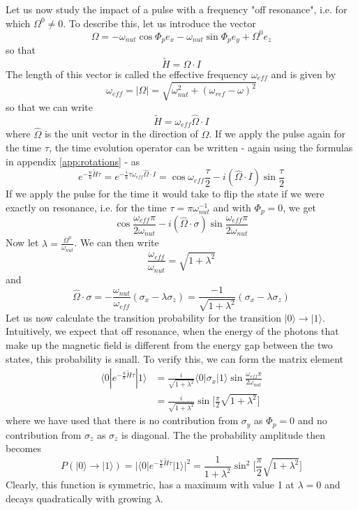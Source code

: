 \documentclass[a4paper, draft]{article}
\theoremstyle{own}
\theoremstyle{remark}
\begin{document}
Let us now study the impact of a pulse with a frequency "off resonance", i.e. for which $\Omega^0 \neq 0$. To describe this, let us introduce the vector
$$
\Omega = - \omega_{nut} \cos \Phi_p e_x  -  \omega_{nut} \sin \Phi_p e_y + \Omega^0 e_z
$$
so that 
$$
\widetilde{H} = \Omega \cdot I
$$
The length of this vector is called the effective frequency $\omega_{eff}$ and is given by
$$
\omega_{eff} = |\Omega| = \sqrt{\omega_{nut}^2 + (\omega_{ref} - \omega)^2}
$$
so that we can write
$$
\widetilde{H} = \omega_{eff} \hat{\Omega} \cdot I
$$
where $\hat{\Omega}$ is the unit vector in the direction of $\Omega$. If we apply the pulse again for the time $\tau$, the time evolution operator can be written - again using the formulas in appendix \ref{app:rotations} - as
$$
e^{-\frac{u}{\hbar} \widetilde{H} \tau} = e^{-\frac{i}{\hbar} \tau \omega_{eff} \hat{\Omega} \cdot I } = \cos \omega_{eff} \frac{\tau}{2} - i (\hat{\Omega} \cdot I) \sin \frac{\tau}{2}
$$
If we apply the pulse for the time it would take to flip the state if we were exactly on resonance, i.e. for the time $\tau = \pi  \omega_{nut}^{-1}$ and with $\Phi_p = 0$, we get
$$
\cos \frac{\omega_{eff}\pi }{2\omega_{nut}} - i (\hat{\Omega} \cdot \sigma) \sin  \frac{\omega_{eff}\pi }{2\omega_{nut}}
$$
Now let $\lambda = \frac{\Omega^0}{\omega_{nut}}$. We can then write
$$
\frac{\omega_{eff}}{\omega_{nut}} = \sqrt{1+\lambda^2}
$$
and
$$
\hat{\Omega} \cdot \sigma = - \frac{\omega_{nut}}{\omega_{eff}} (\sigma_x - \lambda \sigma_z) 
=
\frac{-1}{\sqrt{1+\lambda^2}} (\sigma_x - \lambda \sigma_z)
$$
Let us now calculate the transition probability for the transition $|0 \rangle \rightarrow |1 \rangle$. Intuitively, we expect that off resonance, when the energy of the photons that make up the magnetic field is different from the energy gap between the two states, this probability is small. To verify this, we can form the matrix element
\begin{align*}
\langle 0 | e^{-\frac{u}{\hbar} \widetilde{H} \tau} | 1 \rangle
 &=
\frac{i}{\sqrt{1+\lambda^2}}  \langle 0 | \sigma_x | 1 \rangle 
\sin  \frac{\omega_{eff}\pi }{2\omega_{nut}} \\
&= \frac{i}{\sqrt{1+\lambda^2}} \sin  \big[ \frac{\pi}{2}\sqrt{1+\lambda^2} \big] 
\end{align*}
where we have used that there is no contribution from $\sigma_y$ as $\Phi_p = 0$ and no contribution from $\sigma_z$ as $\sigma_z$ is diagonal. The the probability amplitude then becomes
$$
P(|0 \rangle \rightarrow |1 \rangle) = | \langle 0 | e^{-\frac{u}{\hbar} \widetilde{H} \tau} | 1 \rangle |^2 = \frac{1}{1+\lambda^2} \sin^2 \big[ \frac{\pi}{2}  \sqrt{1+\lambda^2} \big] 
$$
Clearly, this function is symmetric, has a maximum with value 1 at $\lambda = 0$ and decays quadratically with growing $\lambda$. 
\end{document}
